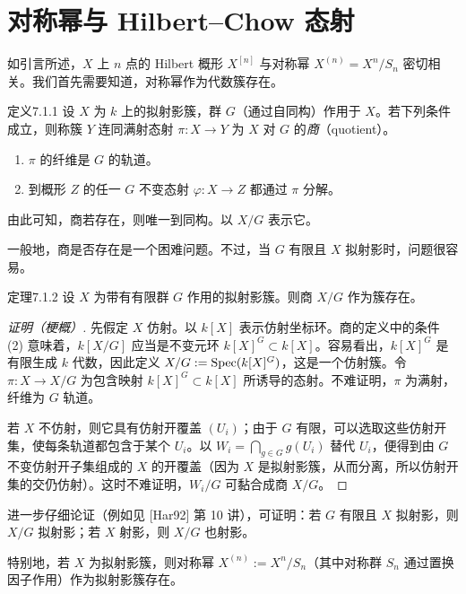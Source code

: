 \section{对称幂与 Hilbert--Chow 态射}
如引言所述，$X$ 上 $n$ 点的 Hilbert 概形 $X^{[n]}$ 与对称幂 $X^{(n)}=X^n/S_n$ 密切相关。我们首先需要知道，对称幂作为代数簇存在。

\begin{origstatement}{定义}{7.1.1}\label{ch07:7.1.1}
设 $X$ 为 $k$ 上的拟射影簇，群 $G$（通过自同构）作用于 $X$。若下列条件成立，则称簇 $Y$ 连同满射态射 $\pi:X\to Y$ 为 $X$ 对 $G$ 的\emph{商}（quotient）。
\begin{enumerate}[label=(\arabic*)]
\item $\pi$ 的纤维是 $G$ 的轨道。
\item 到概形 $Z$ 的任一 $G$ 不变态射 $\varphi:X\to Z$ 都通过 $\pi$ 分解。
\end{enumerate}
由此可知，商若存在，则唯一到同构。以 $X/G$ 表示它。
\end{origstatement}
一般地，商是否存在是一个困难问题。不过，当 $G$ 有限且 $X$ 拟射影时，问题很容易。

\begin{origstatement}{定理}{7.1.2}\label{ch07:7.1.2}
设 $X$ 为带有有限群 $G$ 作用的拟射影簇。则商 $X/G$ 作为簇存在。
\end{origstatement}
\begin{proof}[证明（梗概）]
先假定 $X$ 仿射。以 $k[X]$ 表示仿射坐标环。商的定义中的条件 (2) 意味着，$k[X/G]$ 应当是不变元环 $k[X]^G\subset k[X]$。容易看出，$k[X]^G$ 是有限生成 $k$ 代数，因此定义 $X/G:=\operatorname{Spec}(k[X]^G)$，这是一个仿射簇。令 $\pi:X\to X/G$ 为包含映射 $k[X]^G\subset k[X]$ 所诱导的态射。不难证明，$\pi$ 为满射，纤维为 $G$ 轨道。

若 $X$ 不仿射，则它具有仿射开覆盖 $(U_i)$；由于 $G$ 有限，可以选取这些仿射开集，使每条轨道都包含于某个 $U_i$。以 $W_i=\bigcap_{g\in G}g(U_i)$ 替代 $U_i$，便得到由 $G$ 不变仿射开子集组成的 $X$ 的开覆盖（因为 $X$ 是拟射影簇，从而分离，所以仿射开集的交仍仿射）。这时不难证明，$W_i/G$ 可黏合成商 $X/G$。
\end{proof}
进一步仔细论证（例如见 [Har92] 第 10 讲），可证明：若 $G$ 有限且 $X$ 拟射影，则 $X/G$ 拟射影；若 $X$ 射影，则 $X/G$ 也射影。

特别地，若 $X$ 为拟射影簇，则对称幂 $X^{(n)}:=X^n/S_n$（其中对称群 $S_n$ 通过置换因子作用）作为拟射影簇存在。

